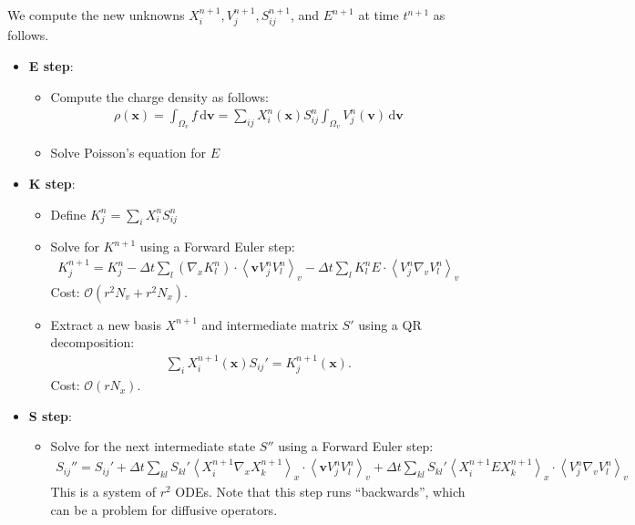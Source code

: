 \documentclass{article}
\begin{document}
We compute the new unknowns \(X_i^{n+1}, V_j^{n+1}, S_{ij}^{n+1}\), and \(E^{n+1}\) at time \(t^{n+1}\) as follows.
\begin{itemize}
    \item \textbf{E step}:
    \begin{itemize}
        \item Compute the charge density as follows:
        \begin{align}
            \rho(\bm{x}) = \int_{\Omega_v}^{} f \,\mathrm{d}\bm{v} = \sum_{ij}^{} X_i^n(\bm{x}) S_{ij}^n \int_{\Omega_v}^{} V_j^n(\bm{v}) \,\mathrm{d}\bm{v}
        \end{align}
    \item Solve Poisson's equation for \(E\)
    \end{itemize}
    
    \item \textbf{K step}:
    \begin{itemize}
    \item Define \(K_j^n = \sum_{i}^{} X_i^n S_{ij}^n\)
    \item Solve for \(K^{n+1}\) using a Forward Euler step:
        \begin{align}
            \label{eqn:K_step}
            K_j^{n+1} = K_j^n - \Delta t \sum_{l}^{} (\nabla_x K_l^n) \cdot \left\langle \bm{v} V^n_j V^n_l \right\rangle_v - \Delta t \sum_{l}^{} K_l^n E \cdot \left\langle V^n_j \nabla_v V^n_l \right\rangle_v
        \end{align}
        Cost: \(\mathcal{O}(r^2N_v + r^2 N_x)\).
    \item Extract a new basis \(X^{n+1}\) and intermediate matrix \(S'\) using a QR decomposition: 
        \begin{align}
            \sum_{i}^{}X_i^{n+1}(\bm{x}) S_{ij}' = K_j^{n+1}(\bm{x}).
        \end{align}
        Cost: \(\mathcal{O}(rN_x)\).
    \end{itemize}
\item \textbf{S step}:
    \begin{itemize}
        \item Solve for the next intermediate state \(S''\) using a Forward Euler step:
            \begin{align}
                S_{ij}'' = S_{ij}' + \Delta t \sum_{kl}^{} S_{kl}' \left\langle X_i^{n+1} \nabla_x X^{n+1}_k \right\rangle_x \cdot \left\langle \bm{v} V_j^n V^n_l \right\rangle_v + \Delta t \sum_{kl}^{} S_{kl}' \left\langle X_i^{n+1} E X_k^{n+1} \right\rangle_x \cdot \left\langle V^n_j \nabla_v V^n_l \right\rangle_v
            \end{align}
        This is a system of \(r^2\) ODEs.
        Note that this step runs ``backwards'', which can be a problem for diffusive operators.
        

\end{itemize}
\end{itemize}
\end{document}

